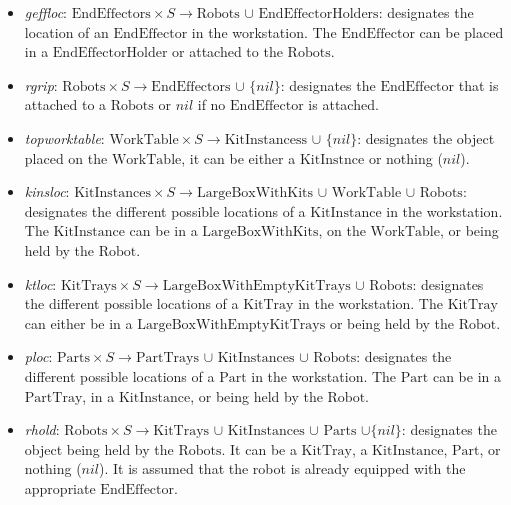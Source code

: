 \begin{small}
\begin{itemize}
\item \emph{geffloc}: $\mathrm{EndEffectors}\times S\rightarrow\mathrm{Robots}$ $\cup$ $\mathrm{EndEffectorHolders}$: designates the location of an $\mathrm{EndEffector}$ in the workstation. The $\mathrm{EndEffector}$ can be placed in a $\mathrm{EndEffectorHolder}$ or attached to the $\mathrm{Robots}$.

\item \emph{rgrip}: $\mathrm{Robots}\times S\rightarrow\mathrm{EndEffectors}$ $\cup$ $\lbrace nil\rbrace$: designates the $\mathrm{EndEffector}$ that is attached to a $\mathrm{Robots}$ or $nil$ if no $\mathrm{EndEffector}$ is attached.

\item \emph{topworktable}: $\mathrm{WorkTable}\times S\rightarrow\mathrm{KitInstancess}$ $\cup$ $\lbrace nil\rbrace$: designates the object placed on the $\mathrm{WorkTable}$, it can be either a $\mathrm{KitInstnce}$ or nothing ($nil$).

\item \emph{kinsloc}: $\mathrm{KitInstances}\times S\rightarrow\mathrm{LargeBoxWithKits}$ $\cup$ $\mathrm{WorkTable}$ $\cup$ $\mathrm{Robots}$: designates the different possible locations of a $\mathrm{KitInstance}$ in the workstation. The $\mathrm{KitInstance}$ can be in a $\mathrm{LargeBoxWithKits}$, on the $\mathrm{WorkTable}$, or being held by the $\mathrm{Robot}$.
    
\item \emph{ktloc}: $\mathrm{KitTrays}\times S\rightarrow\mathrm{LargeBoxWithEmptyKitTrays}$ $\cup$ $\mathrm{Robots}$: designates the different possible locations of a $\mathrm{KitTray}$ in the workstation. The $\mathrm{KitTray}$ can either be in a $\mathrm{LargeBoxWithEmptyKitTrays}$ or being held by the $\mathrm{Robot}$.

\item \emph{ploc}: $\mathrm{Parts}\times S\rightarrow\mathrm{PartTrays}$ $\cup$ $\mathrm{KitInstances}$ $\cup$ $\mathrm{Robots}$: designates the different possible locations of a $\mathrm{Part}$ in the workstation. The $\mathrm{Part}$ can be in a $\mathrm{PartTray}$, in a $\mathrm{KitInstance}$, or being held by the $\mathrm{Robot}$.

\item \emph{rhold}: $\mathrm{Robots}\times S\rightarrow\mathrm{KitTrays}$ $\cup$ $\mathrm{KitInstances}$ $\cup$ $\mathrm{Parts}$ $\cup \lbrace nil\rbrace$: designates the object being held by the $\mathrm{Robots}$. It can be a $\mathrm{KitTray}$, a $\mathrm{KitInstance}$, $\mathrm{Part}$, or nothing ($nil$). It is assumed that the robot is already equipped with the appropriate $\mathrm{EndEffector}$.


\end{itemize}
\end{small}
